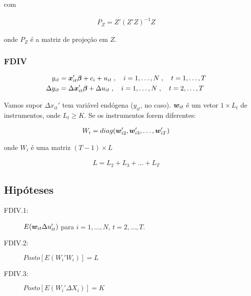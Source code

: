 \documentclass[11pt,oneside,a4paper]{article}
\numberwithin{equation}{section}
\begin{document}
\begin{description}
\begin{description}
\noindent
com

\vspace{-1 em}
\begin{align*}
\boxed{P_{Z} = Z'(Z'Z)^{-1}Z }
\end{align*}

\noindent
onde
$P_{Z}$ é a matriz de projeção em $Z$.

\subsubsection*{FDIV}

\vspace{-1 em}
\begin{align*}
y_{it} &= \boldsymbol{x}_{it}' \boldsymbol{\beta} + c_{i} + u_{it}
\; , \quad i = 1, \dots, N
\; , \quad t = 1, \dots, T
\\
\Delta y_{it} &= \Delta \boldsymbol{x}_{it}' \boldsymbol{\beta} + \Delta u_{it}
\; , \quad i = 1, \dots, N
\; , \quad t = 2, \dots, T
\end{align*}

Vamos supor $\Delta x_{it}'$ tem variável endógena ($y_{it}$, no caso).
$\boldsymbol{w}_{it}$ é um vetor $1 \times L_{t}$ de instrumentos, onde $L_{t} \geq K$.
Se os instrumentos forem diferentes:

\vspace{-1 em}
\begin{align*}
	W_{i} = diag( \boldsymbol{w}_{i2}', \boldsymbol{w}_{i3}', \dots, \boldsymbol{w}_{iT}')
\end{align*}

\noindent
onde $W_{i}$ é uma matriz $( T - 1 ) \times L$

\vspace{-1 em}
\begin{align*}
	L = L_{2} + L_{3} + \dots + L_{T}
\end{align*}

\subsection*{Hipóteses}

\begin{description}
\item[FDIV.1:] $E( \boldsymbol{w}_{it} \Delta u_{it}')$ para $i = 1, \dots, N$, $t = 2, \dots, T$.
\item[FDIV.2:] $Posto\left[ E( W_{i}' W_{i} ) \right] = L$
\item[FDIV.3:] $Posto\left[ E( W_{i}' \Delta X_{i} ) \right] = K$
\end{description}


\end{description}
\end{description}
\end{document}
